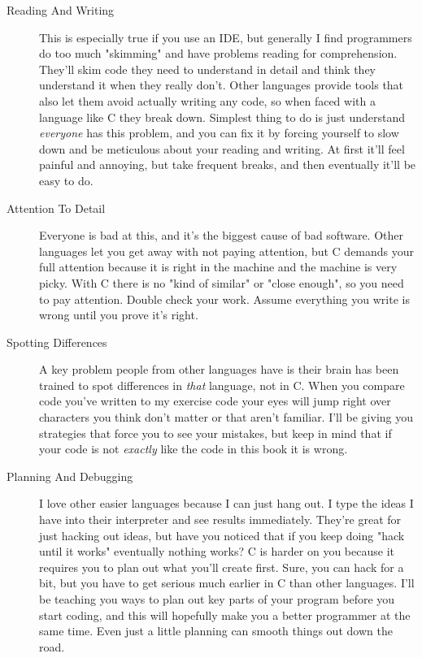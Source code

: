 \begin{description}

\item[Reading And Writing] This is especially true if you use an IDE, but
    generally I find programmers do too much "skimming" and have problems
    reading for comprehension.  They'll skim code they need to understand
    in detail and think they understand it when they really don't.  Other languages
    provide tools that also let them avoid actually writing any code, so
    when faced with a language like C they break down.  Simplest thing to
    do is just understand \emph{everyone} has this problem, and you can fix
    it by forcing yourself to slow down and be meticulous about your reading
    and writing.  At first it'll feel painful and annoying, but take frequent
    breaks, and then eventually it'll be easy to do.

\item[Attention To Detail] Everyone is bad at this, and it's the biggest cause
    of bad software.  Other languages let you get away with not paying attention,
    but C demands your full attention because it is right in the machine and the
    machine is very picky.  With C there is no "kind of similar" or "close enough",
    so you need to pay attention.  Double check your work.  Assume everything you
    write is wrong until you prove it's right.

\item[Spotting Differences] A key problem people from other languages have is 
    their brain has been trained to spot differences in \emph{that} language,
    not in C.  When you compare code you've written to my exercise code your
    eyes will jump right over characters you think don't matter or that aren't
    familiar.  I'll be giving you strategies that force you to see your 
    mistakes, but keep in mind that if your code is not \emph{exactly} like
    the code in this book it is wrong.

\item[Planning And Debugging]  I love other easier languages because I can
    just hang out. I type the ideas I have into their interpreter and see results immediately.
    They're great for just hacking out ideas, but have you noticed that if you
    keep doing "hack until it works" eventually nothing works?  C is harder on
    you because it requires you to plan out what you'll create first.  Sure,
    you can hack for a bit, but you have to get serious much earlier in C than
    other languages.  I'll be teaching you ways to plan out key parts of your
    program before you start coding, and this will hopefully make you a
    better programmer at the same time.  Even just a little planning can smooth
    things out down the road.
\end{description}

